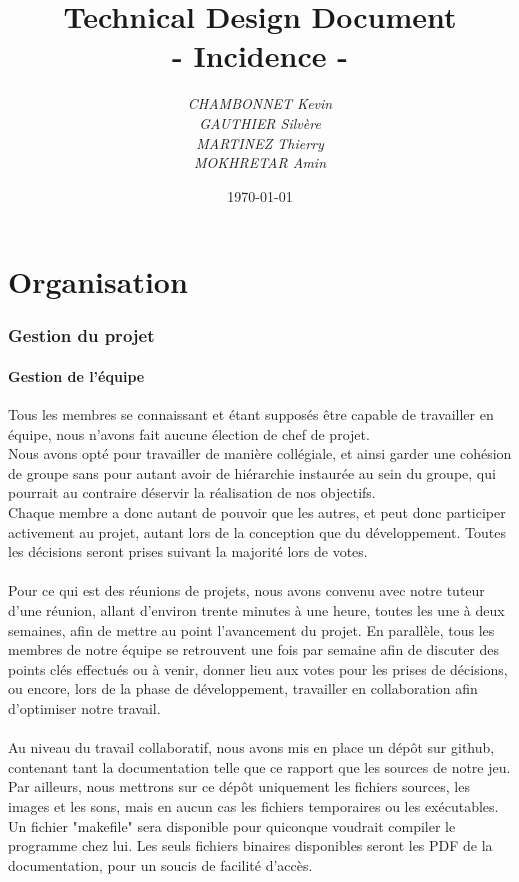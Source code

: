 \documentclass[a4paper]{article}
\title{\textbf{Technical Design Document}\\- \Huge{Incidence} -}
\author{\emph{CHAMBONNET Kevin}\\\emph{GAUTHIER Silvère}\\\emph{MARTINEZ Thierry}\\\emph{MOKHRETAR Amin}}
\date{\today}
\newcommand{\alinea}{\hspace*{0.5cm}}
\begin{document}
  \maketitle
  \newpage
  \tableofcontents


  \newpage
  \part{Organisation}
    \section{Gestion du projet}
      \subsection{Gestion de l'équipe}
        \alinea Tous les membres se connaissant et étant supposés être capable de travailler en équipe, nous n'avons fait aucune élection de chef de projet.\\
        \alinea Nous avons opté pour travailler de manière collégiale, et ainsi garder une cohésion de groupe sans pour autant avoir de hiérarchie instaurée au sein du groupe, qui pourrait au contraire déservir la réalisation de nos objectifs.\\
        \alinea Chaque membre a donc autant de pouvoir que les autres, et peut donc participer activement au projet, autant lors de la conception que du développement. Toutes les décisions seront prises suivant la majorité lors de votes.\\\\
        \alinea Pour ce qui est des réunions de projets, nous avons convenu avec notre tuteur d'une réunion, allant d'environ trente minutes à une heure, toutes les une à deux semaines, afin de mettre au point l'avancement du projet. En parallèle, tous les membres de notre équipe se retrouvent une fois par semaine afin de discuter des points clés effectués ou à venir, donner lieu aux votes pour les prises de décisions, ou encore, lors de la phase de développement, travailler en collaboration afin d'optimiser notre travail.\\\\
        \alinea Au niveau du travail collaboratif, nous avons mis en place un dépôt sur github, contenant tant la documentation telle que ce rapport que les sources de notre jeu. Par ailleurs, nous mettrons sur ce dépôt uniquement les fichiers sources, les images et les sons, mais en aucun cas les fichiers temporaires ou les exécutables. Un fichier "makefile" sera disponible pour quiconque voudrait compiler le programme chez lui. Les seuls fichiers binaires disponibles seront les PDF de la documentation, pour un soucis de facilité d'accès.
\end{document}
